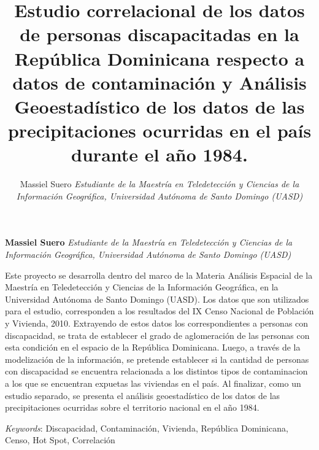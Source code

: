 \documentclass[11pt,]{article}
\title{Estudio correlacional de los datos de personas discapacitadas en la
República Dominicana respecto a datos de contaminación y Análisis
Geoestadístico de los datos de las precipitaciones ocurridas en el país
durante el año 1984.  }
\author{\Large Massiel Suero\vspace{0.05in} \newline\normalsize\emph{Estudiante de la Maestría en Teledetección y Ciencias de la Información
Geográfica, Universidad Autónoma de Santo Domingo (UASD)}  }
\date{}
\newcommand*{\authorfont}{\fontfamily{phv}\selectfont}
\renewenvironment{abstract}
 {{%
    \setlength{\leftmargin}{0mm}
    \setlength{\rightmargin}{\leftmargin}%
  }%
  \relax}
 {\endlist}
\begin{document}
	
%

{%
\setlength{\parindent}{0pt}
\thispagestyle{plain}
{\fontsize{18}{20}\selectfont\raggedright 
\maketitle  %

}

{
   \vskip 13.5pt\relax \normalsize\fontsize{11}{12} 
\textbf{\authorfont Massiel Suero} \hskip 15pt \emph{\small Estudiante de la Maestría en Teledetección y Ciencias de la Información
Geográfica, Universidad Autónoma de Santo Domingo (UASD)}   

}

}








\begin{abstract}

    \hbox{\vrule height .2pt width 39.14pc}

    \vskip 8.5pt %

\noindent Este proyecto se desarrolla dentro del marco de la Materia Análisis
Espacial de la Maestría en Teledetección y Ciencias de la Información
Geográfica, en la Universidad Autónoma de Santo Domingo (UASD). Los
datos que son utilizados para el estudio, corresponden a los resultados
del IX Censo Nacional de Población y Vivienda, 2010. Extrayendo de estos
datos los correspondientes a personas con discapacidad, se trata de
establecer el grado de aglomeración de las personas con esta condición
en el espacio de la República Dominicana. Luego, a través de la
modelización de la información, se pretende establecer si la cantidad de
personas con discapacidad se encuentra relacionada a los distintos tipos
de contaminacion a los que se encuentran expuetas las viviendas en el
país. Al finalizar, como un estudio separado, se presenta el análisis
geoestadístico de los datos de las precipitaciones ocurridas sobre el
territorio nacional en el año 1984.


\vskip 8.5pt \noindent \emph{Keywords}: Discapacidad, Contaminación, Vivienda, República Dominicana, Censo, Hot
Spot, Correlación \par

    \hbox{\vrule height .2pt width 39.14pc}



\end{abstract}
\end{document}
